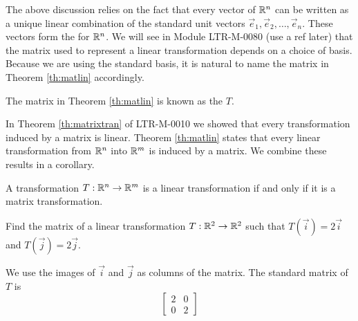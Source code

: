 \documentclass{ximera}
\begin{document}
The above discussion relies on the fact that every vector of $\mathbb{R}^n$ can be written as a unique linear combination of the standard unit vectors $\vec{e}_1,\vec{e}_2,\dots,\vec{e}_n$.  These vectors form the  for $\mathbb{R}^n$.  We will see in Module {\color{red}LTR-M-0080 (use a ref later)} that the matrix used to represent a linear transformation depends on a choice of basis.  Because we are using the standard basis, it is natural to name the matrix in Theorem \ref{th:matlin} accordingly.


\begin{definition} 
  
The matrix in Theorem \ref{th:matlin} is known as the  $T$.
  
\end{definition}


In Theorem \ref{th:matrixtran} of LTR-M-0010 we showed that every transformation induced by a matrix is linear.  Theorem \ref{th:matlin} states that every linear transformation from $\mathbb{R}^n$ into $\mathbb{R}^m$ is induced by a matrix.  We combine these results in a corollary.


  \begin{corollary}\label{cor} A transformation $T:\mathbb{R}^n\rightarrow\mathbb{R}^m$ is a linear transformation if and only if it is a matrix transformation.
\end{corollary}

\begin{example}\label{ex:findmatrix}
Find the matrix of a linear transformation $T:\mathbb{R}^2\rightarrow \mathbb{R}^2$ such that $T(\vec{i})=2\vec{i}$ and $T(\vec{j})=2\vec{j}$.  
\begin{explanation}
We use the images of $\vec{i}$ and $\vec{j}$ as columns of the matrix.  The standard matrix of $T$ is
$$\begin{bmatrix}2&0\\0&2\end{bmatrix}$$
\end{explanation}
\end{example}
 
 
 
\end{document}
